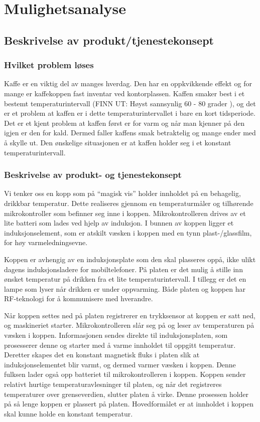 
\chapter{Mulighetsanalyse}
\section{Beskrivelse av produkt/tjenestekonsept}
\subsection{Hvilket problem løses}
Kaffe er en viktig del av manges hverdag. Den har en oppkvikkende effekt og for mange er kaffekoppen fast inventar ved kontorplassen. Kaffen smaker best i et bestemt temperaturintervall (FINN UT: Høyst sannsynlig 60 - 80 grader \cite{bestekaffe} ), og det er et problem at kaffen er i dette temperaturintervallet i bare en kort tidsperiode. Det er et kjent problem at kaffen først er for varm og når man kjenner på den igjen er den for kald. Dermed faller kaffens smak betraktelig og mange ender med å skylle ut. Den ønskelige situasjonen er at kaffen holder seg i et konstant temperaturintervall. 

\subsection{Beskrivelse av produkt- og tjenestekonsept}
Vi tenker oss en kopp som på “magisk vis” holder innholdet på en behagelig, drikkbar temperatur. Dette realiseres gjennom en temperaturmåler og tilhørende mikrokontroller som befinner seg inne i koppen. Mikrokontrolleren drives av et lite batteri som lades ved hjelp av induksjon. I bunnen av koppen ligger et induksjonselement, som er atskilt væsken i koppen med en tynn plast-/glassfilm, for høy varmeledningsevne.

Koppen er avhengig av en induksjonsplate som den skal plasseres oppå, ikke ulikt dagens induksjonsladere for mobiltelefoner. På platen er det mulig å stille inn ønsket temperatur på drikken fra et lite temperaturintervall. I tillegg er det en lampe som lyser når drikken er under oppvarming. Både platen og koppen har RF-teknologi for å kommunisere med hverandre.

Når koppen settes ned på platen registrerer en trykksensor at koppen er satt ned, og maskineriet starter. Mikrokontrolleren slår seg på og leser av temperaturen på væsken i koppen. Informasjonen sendes direkte til induksjonsplaten, som prosesserer denne og starter med å varme innholdet til oppgitt temperatur. Deretter skapes det en konstant magnetisk fluks i platen slik at induksjonselementet blir varmt, og dermed varmer væsken i koppen. Denne fulksen lader også opp batteriet til mikrokontrolleren i koppen. 
Koppen sender relativt hurtige temperaturavlesninger til platen, og når det registreres temperaturer over grenseverdien, slutter platen å virke. Denne prosessen holder på så lenge koppen er plassert på platen. Hovedformålet er at innholdet i koppen skal kunne holde en konstant temperatur.

